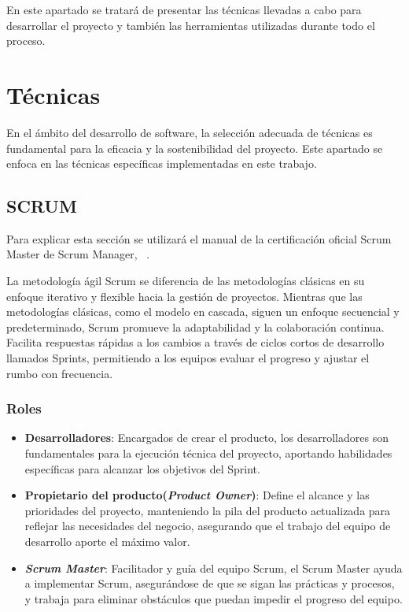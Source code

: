 
En este apartado se tratará de presentar las técnicas llevadas a cabo para desarrollar el proyecto y también las herramientas utilizadas durante todo el proceso.
\section{Técnicas}
En el ámbito del desarrollo de software, la selección adecuada de técnicas es fundamental para la eficacia y la sostenibilidad del proyecto. Este apartado se enfoca en las técnicas específicas implementadas en este trabajo.
\subsection{SCRUM}
Para explicar esta sección se utilizará el manual de la certificación oficial Scrum Master de Scrum Manager, ~\cite{SCRUM}.


La metodología ágil Scrum se diferencia de las metodologías clásicas en su enfoque iterativo y flexible hacia la gestión de proyectos. Mientras que las metodologías clásicas, como el modelo en cascada, siguen un enfoque secuencial y predeterminado, Scrum promueve la adaptabilidad y la colaboración continua. Facilita respuestas rápidas a los cambios a través de ciclos cortos de desarrollo llamados Sprints, permitiendo a los equipos evaluar el progreso y ajustar el rumbo con frecuencia.
\subsubsection{Roles}
\begin{itemize}
	\item \textbf{Desarrolladores}: Encargados de crear el producto, los desarrolladores son fundamentales para la ejecución técnica del proyecto, aportando habilidades específicas para alcanzar los objetivos del Sprint.
	\item \textbf{Propietario del producto(\textit{Product Owner})}: Define el alcance y las prioridades del proyecto, manteniendo la pila del producto actualizada para reflejar las necesidades del negocio, asegurando que el trabajo del equipo de desarrollo aporte el máximo valor.
	\item \textbf{\textit{Scrum Master}}: Facilitador y guía del equipo Scrum, el Scrum Master ayuda a implementar Scrum, asegurándose de que se sigan las prácticas y procesos, y trabaja para eliminar obstáculos que puedan impedir el progreso del equipo.
\end{itemize}

